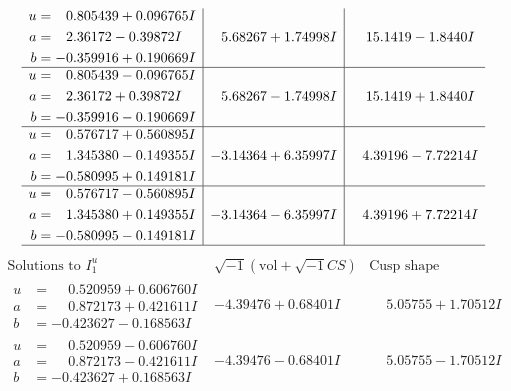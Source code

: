 \documentclass[1p]{elsarticle_modified}
\theoremstyle{definition}
\newcommand{\I}{\sqrt{-1}}
\begin{document}
$$\begin{array}{c|c|c}
\begin{aligned}
u &= \phantom{-}0.805439 + 0.096765 I \\
a &= \phantom{-}2.36172 - 0.39872 I \\
b &= -0.359916 + 0.190669 I\end{aligned}
 & \phantom{-}5.68267 + 1.74998 I & \phantom{-}15.1419 - 1.8440 I \\ \hline\begin{aligned}
u &= \phantom{-}0.805439 - 0.096765 I \\
a &= \phantom{-}2.36172 + 0.39872 I \\
b &= -0.359916 - 0.190669 I\end{aligned}
 & \phantom{-}5.68267 - 1.74998 I & \phantom{-}15.1419 + 1.8440 I \\ \hline\begin{aligned}
u &= \phantom{-}0.576717 + 0.560895 I \\
a &= \phantom{-}1.345380 - 0.149355 I \\
b &= -0.580995 + 0.149181 I\end{aligned}
 & -3.14364 + 6.35997 I & \phantom{-}4.39196 - 7.72214 I \\ \hline\begin{aligned}
u &= \phantom{-}0.576717 - 0.560895 I \\
a &= \phantom{-}1.345380 + 0.149355 I \\
b &= -0.580995 - 0.149181 I\end{aligned}
 & -3.14364 - 6.35997 I & \phantom{-}4.39196 + 7.72214 I\\
 \hline 
 \end{array}$$\newpage$$\begin{array}{c|c|c}  
\text{Solutions to }I^u_{1}& \I (\text{vol} + \sqrt{-1}CS) & \text{Cusp shape}\\
 \hline 
\begin{aligned}
u &= \phantom{-}0.520959 + 0.606760 I \\
a &= \phantom{-}0.872173 + 0.421611 I \\
b &= -0.423627 - 0.168563 I\end{aligned}
 & -4.39476 + 0.68401 I & \phantom{-}5.05755 + 1.70512 I \\ \hline\begin{aligned}
u &= \phantom{-}0.520959 - 0.606760 I \\
a &= \phantom{-}0.872173 - 0.421611 I \\
b &= -0.423627 + 0.168563 I\end{aligned}
 & -4.39476 - 0.68401 I & \phantom{-}5.05755 - 1.70512 I \\ \hline\begin{aligned}

\end{aligned}
\end{array}$$
\end{document}
